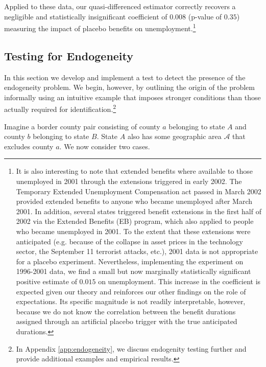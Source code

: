 \documentclass[12pt]{article}
\newcommand{\1}{\mathbf{1}}
\begin{document}
Applied to these data, our quasi-differenced estimator correctly recovers a negligible and statistically insignificant coefficient of $0.008$ (p-value of $0.35$) measuring the impact of placebo benefits on unemployment.\footnote{It is also interesting to note that extended benefits where available to those unemployed in 2001 through the extensions triggered in early 2002. The Temporary Extended Unemployment Compensation act passed in March 2002 provided extended benefits to anyone who became unemployed after March 2001. In addition, several states triggered benefit extensions in the first half of 2002 via the Extended Benefits (EB) program, which also applied to people who became unemployed in 2001. To the extent that these extensions were anticipated (e.g. because of the collapse in asset prices in the technology sector, the September 11 terrorist attacks, etc.), 2001 data is not appropriate for a placebo experiment. Nevertheless, implementing the experiment on 1996-2001 data, we find a small but now marginally statistically significant positive estimate of $0.015$ on unemployment. This increase in the coefficient is expected given our theory and reinforces our other findings on the role of expectations. Its specific magnitude is not readily interpretable, however, because we do not know the correlation between the benefit durations assigned through an artificial placebo trigger with the true anticipated durations.}




\subsection{Testing for Endogeneity}
\label{sec:endogeneity_test}

In this section we develop and implement a test to detect the presence of the endogeneity problem. We begin, however, by outlining the origin of the problem informally using an intuitive example that imposes stronger conditions than those actually required for identification.\footnote{In Appendix \ref{app:endogeneity}, we discuss endogenity testing further and provide additional examples and empirical results.}

Imagine a border county pair consisting of county $a$ belonging to state $A$ and county $b$ belonging to state $B$. State $A$ also has some geographic area $\mathcal{A}$ that excludes county $a$. We now consider two cases.
\end{document}
